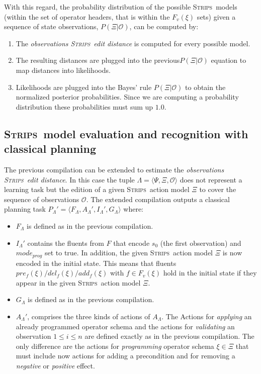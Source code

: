 \documentclass{article}
\newcommand{\tup}[1]{{\langle #1 \rangle}}
\newcommand{\strips}{\textsc{Strips}}     %
\begin{document}
With this regard, the probability distribution of the possible \strips\ models (within the set of operator headers, that is within the $F_v(\xi)$ sets) given a sequence of state observations,  $P(\Xi|\mathcal{O})$, can be computed by:
\begin{enumerate}
\item The {\em observations  \strips\ edit distance} is computed for every possible model.
\item The resulting distances are plugged into the previous$P(\Xi|\mathcal{O})$ equation to map distances into likelihoods.
\item Likelihoods are plugged into the Bayes’ rule $P(\Xi|\mathcal{O})$ to obtain the normalized posterior probabilities. Since we are computing a probability distribution these probabilities must sum up $1.0$.
\end{enumerate}



\subsection{\strips\ model evaluation and recognition with classical planning}
The previous compilation can be extended to estimate the {\em observations  \strips\ edit distance}. In this case the tuple $\Lambda=\tup{\Psi,\Xi,\mathcal{O}}$ does not represent a learning task but the edition of a given \strips\ action model $\Xi$ to cover the sequence of observations $\mathcal{O}$. The extended compilation outputs a classical planning task $P_{\Lambda}'=\tup{F_{\Lambda},A_{\Lambda}',I_{\Lambda}',G_{\Lambda}}$ where:
\begin{itemize}
\item $F_{\Lambda}$ is defined as in the previous compilation.
\item $I_{\Lambda}'$ contains the fluents from $F$ that encode $s_0$ (the first observation) and $mode_{prog}$ set to true. In addition, the given \strips\ action model $\Xi$ is now encoded in the initial state. This means that fluents $pre_f(\xi)/del_f(\xi)/add_f(\xi)$ with $f\in F_v(\xi)$ hold in the initial state if they appear in the given \strips\ action model $\Xi$.
\item $G_{\Lambda}$ is defined as in the previous compilation.
\item $A_{\Lambda}'$, comprises the three kinds of actions of $A_{\Lambda}$. The Actions for {\em applying} an already programmed operator schema and the actions for {\em validating} an observation {\tt\small $1\leq i\leq n$} are defined exactly as in the previous compilation. The only difference are the actions for {\em programming} operator schema $\xi\in\Xi$ that must include now actions for adding a precondition and for removing a {\em negative} or {\em positive} effect.
\end{itemize}
\end{document}
